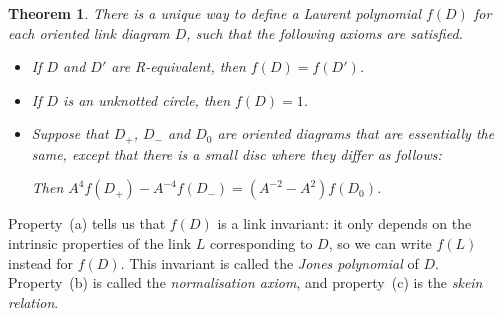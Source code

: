 \documentclass[reqno]{amsart}
\newtheorem{theorem}{Theorem}[section]
\theoremstyle{definition}
\begin{document}
\begin{theorem}\label{thm-jones}
 There is a unique way to define a Laurent polynomial $f(D)$ for each
 oriented link diagram $D$, such that the following axioms are satisfied.
 \begin{itemize}
  \item[(a)] If $D$ and $D'$ are R-equivalent, then $f(D)=f(D')$.
  \item[(b)] If $D$ is an unknotted circle, then $f(D)=1$.
  \item[(c)] Suppose that $D_+$, $D_-$ and $D_0$ are oriented diagrams
   that are essentially the same, except that there is a small disc
   where they differ as follows:
   \begin{center}
   \end{center}
   \vspace{4ex}
   Then $A^4f(D_+)-A^{-4}f(D_-)=(A^{-2}-A^2)f(D_0)$.
 \end{itemize}
\end{theorem}

Property~(a) tells us that $f(D)$ is a link invariant: it only depends
on the intrinsic properties of the link $L$ corresponding to $D$, so
we can write $f(L)$ instead for $f(D)$.  This invariant is called the
\emph{Jones polynomial} of $D$.  Property~(b) is called the
\emph{normalisation axiom}, and property~(c) is the \emph{skein
 relation}.  
\end{document}
